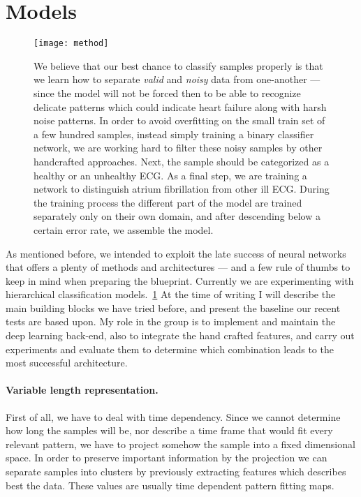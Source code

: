 \section{Models}
\begin{figure}[h]
  \centering
  \texttt{[image: method]}\label{fig:method}
  \caption{We believe that our best chance to classify samples properly is that we learn how to separate \textit{valid} and \textit{noisy} data from one-another --- since the model will not be forced then to be able to recognize delicate patterns which could indicate heart failure along with harsh noise patterns. In order to avoid overfitting on the small train set of a few hundred samples, instead simply training a binary classifier network, we are working hard to filter these noisy samples by other handcrafted approaches. Next, the sample should be categorized as a healthy or an unhealthy ECG. As a final step, we are training a network to distinguish atrium fibrillation from other ill ECG. During the training process the different part of the model are trained separately only on their own domain, and after descending below a certain error rate, we assemble the model.}
\end{figure}

As mentioned before, we intended to exploit the late success of neural networks that offers a plenty of methods and architectures --- and a few rule of thumbs to keep in mind when preparing the blueprint.
Currently we are experimenting with hierarchical classification models.~\ref{fig:method}
At the time of writing I will describe the main building blocks we have tried before, and present the baseline our recent tests are based upon.
My role in the group is to implement and maintain the deep learning back-end, also to integrate the hand crafted features, and carry out experiments and evaluate them to determine which combination leads to the most successful architecture.

\paragraph{Variable length representation.}
First of all, we have to deal with time dependency. Since we cannot determine how long the samples will be, nor describe a time frame that would fit every relevant pattern, we have to project somehow the sample into a fixed dimensional space. In order to preserve important information by the projection we can separate samples into clusters by previously extracting features which describes best the data. These values are usually time dependent pattern fitting maps.

